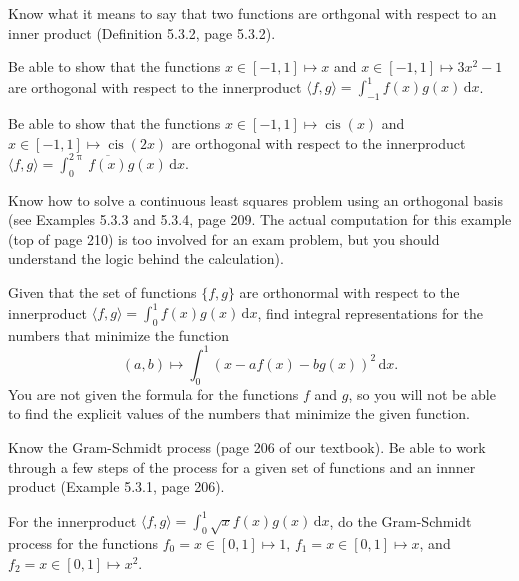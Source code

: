 \documentclass[12pt,fleqn,answers]{exam}
\DeclareMathOperator{\cis}{cis}
\begin{document}
\begin{questions}

\item Know what it means to say that two functions are orthgonal with respect to an inner product (Definition 5.3.2, page 5.3.2).

\item Be able to show that the functions $x  \in [-1,1] \mapsto x$ and $x \in [-1,1] \mapsto  3 x^2 - 1$ are orthogonal
with respect to the innerproduct $\langle f, g \rangle = \int_{-1}^1 f(x) g(x) \, \mathrm{d} x$.

\item Be able to show that the functions $x  \in [-1,1] \mapsto \cis(x) $ and $x \in [-1,1] \mapsto  \cis(2 x)$ are orthogonal
with respect to the innerproduct $\langle f, g \rangle = \int_{0}^{2 \uppi} \overline{f(x)} g(x) \, \mathrm{d} x$.

\item Know how to solve a continuous least squares problem using an orthogonal basis (see Examples 5.3.3 and 5.3.4, page 209. The actual computation for this example (top of page 210) is too involved for an exam problem, but you should 
understand the logic behind the calculation).

\item Given that the set of functions $\{f,g\}$ are orthonormal with respect to the innerproduct $\langle f, g \rangle =
\int_0^1 f(x) g(x) \, \mathrm{d} x$, find integral representations for the numbers that minimize the 
function
\begin{equation*}
   (a,b) \mapsto \int_0^1 \left(x - a f(x) - b g(x) \right)^2 \, \mathrm{d} x.
\end{equation*}
You are not given the formula for the functions $f$ and $g$, so you will not be able to find the explicit values of
the numbers that minimize the given function.

\item Know the Gram-Schmidt process (page 206 of our textbook). Be able to work through a few steps of the process for
a given set of functions and an innner product (Example 5.3.1, page 206).

\item For the innerproduct $\langle f, g \rangle = \int_{0}^{1} \sqrt{x} f(x) g(x) \, \mathrm{d} x$, do the Gram-Schmidt
process for the functions $f_0 = x \in [0,1] \mapsto 1$, $f_1 = x \in [0,1] \mapsto x$, 
and $f_2 = x \in [0,1] \mapsto x^2$.


\end{questions}
\end{document}
